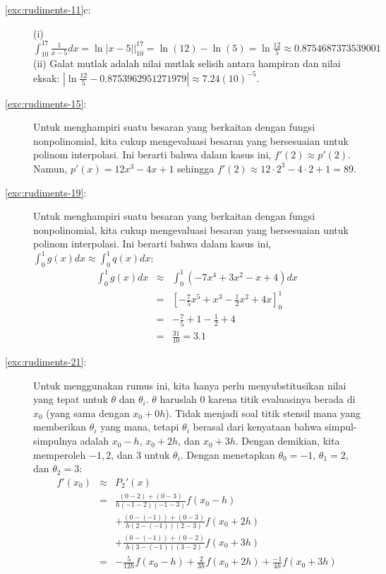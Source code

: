 \begin{description}
\item [{\ref{exc:rudiments-11}c:}] (i) $\int_{10}^{17}\frac{1}{x-5}dx=\left.\ln|x-5|\right|_{10}^{17}=\ln(12)-\ln(5)=\ln\frac{12}{5}\approx0.8754687373539001$
(ii) Galat mutlak adalah nilai mutlak selisih antara hampiran dan
nilai eksak: $|\ln\frac{12}{5}-0.8753962951271979|\approx7.24(10)^{-5}$.
\item [{\ref{exc:rudiments-15}:}] Untuk menghampiri suatu besaran yang
berkaitan dengan fungsi nonpolinomial, kita cukup mengevaluasi besaran
yang bersesuaian untuk polinom interpolasi. Ini berarti bahwa dalam
kasus ini, $f'(2)\approx p'(2)$. Namun, $p'(x)=12x^{3}-4x+1$ sehingga
$f'(2)\approx12\cdot2^{3}-4\cdot2+1=89$.
\item [{\ref{exc:rudiments-19}:}] Untuk menghampiri suatu besaran yang
berkaitan dengan fungsi nonpolinomial, kita cukup mengevaluasi besaran
yang bersesuaian untuk polinom interpolasi. Ini berarti bahwa dalam
kasus ini, $\int_{0}^{1}g(x)dx\approx\int_{0}^{1}q(x)dx$:
\begin{eqnarray*}
\int_{0}^{1}g(x)dx & \approx & \int_{0}^{1}(-7x^{4}+3x^{2}-x+4)dx\\
 & = & \left[-\frac{7}{5}x^{5}+x^{3}-\frac{1}{2}x^{2}+4x\right]_{0}^{1}\\
 & = & -\frac{7}{5}+1-\frac{1}{2}+4\\
 & = & \frac{31}{10}=3.1
\end{eqnarray*}
\item [{\ref{exc:rudiments-21}:}] Untuk menggunakan rumus ini, kita hanya
perlu menyubstitusikan nilai yang tepat untuk $\theta$ dan $\theta_{i}$.
$\theta$ haruslah $0$ karena titik evaluasinya berada di $x_{0}$
(yang sama dengan $x_{0}+0h$). Tidak menjadi soal titik stensil mana
yang memberikan $\theta_{i}$ yang mana, tetapi $\theta_{i}$ berasal
dari kenyataan bahwa simpul-simpulnya adalah $x_{0}-h$, $x_{0}+2h$,
dan $x_{0}+3h$. Dengan demikian, kita memperoleh $-1,2$, dan $3$
untuk $\theta_{i}$. Dengan menetapkan $\theta_{0}=-1$, $\theta_{1}=2$,
dan $\theta_{2}=3$: 
\begin{eqnarray*}
f'(x_{0}) & \approx & P_{2}'(x)\\
 & = & \frac{(0-2)+(0-3)}{h(-1-2)(-1-3)}f(x_{0}-h)\\
 &  & +\frac{(0-(-1))+(0-3)}{h(2-(-1))(2-3)}f(x_{0}+2h)\\
 &  & +\frac{(0-(-1))+(0-2)}{h(3-(-1))(3-2)}f(x_{0}+3h)\\
 & = & -\frac{5}{12h}f(x_{0}-h)+\frac{2}{3h}f(x_{0}+2h)+\frac{-1}{4h}f(x_{0}+3h)\\

\end{eqnarray*}
\end{description}
